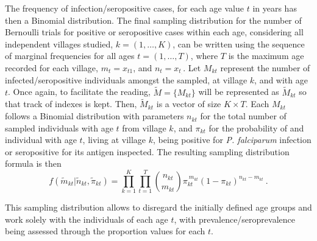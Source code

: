 \noindent
The frequency of infection/seropositive cases, for each age value $t$ in years has then a Binomial distribution.
The final sampling distribution for the number of Bernoulli trials for positive or seropositive cases within each age, considering all independent villages studied, $k=(1,\dots,K)$, can be written using the sequence of marginal frequencies for all ages $t=(1,\dots,T)$, where $T$ is the maximum age recorded for each village, $m_t=x_{t1}$, and $n_t=x_{t_\cdot}$.
Let $M_{kt}$ represent the number of infected/seropositive individuals amongst the sampled, at village $k$, and with age $t$.
Once again, to facilitate the reading, $\tilde{M}=\{M_{kt}\}$ will be represented as $\tilde{M}_{kt}$ so that track of indexes is kept.
Then, $\tilde{M}_{kt}$ is a vector of size $K\times T$.
Each $M_{kt}$ follows a Binomial distribution with parameters $n_{kt}$ for the total number of sampled individuals with age $t$ from village $k$, and $\pi_{kt}$ for the probability of and individual with age $t$, living at village $k$, being positive for \textit{P. falciparum} infection or seropositive for its antigen inspected.
The resulting sampling distribution formula is then
%
\begin{equation}
\label{eq:sampling.distribution}
f(\tilde{m}_{kt} | \tilde{n}_{kt}, \tilde{\pi}_{kt}) = \prod_{k=1}^K \prod_{t=1}^T \binom{n_{kt}}{m_{kt}} \pi_{kt}^{\ m_{kt}} (1-\pi_{kt})^{n_{kt} - m_{kt}}\ .
\end{equation}

\noindent
This sampling distribution allows to disregard the initially defined age groups and work solely with the individuals of each age $t$, with prevalence/seroprevalence being assessed through the proportion values for each $t$.

